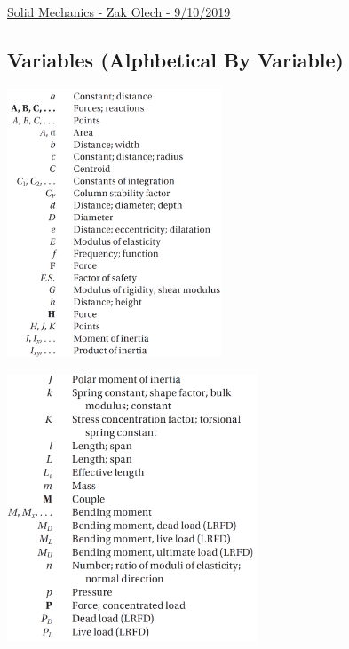 \documentclass[10pt,landscape]{article}
\newenvironment{Figure}
     {\par\medskip\noindent\minipage{\linewidth}}
     {\endminipage\par\medskip}
\begin{document}
\raggedright
\footnotesize

\begin{center}
     \Large{\underline{Solid Mechanics - Zak Olech - 9/10/2019}}
\end{center}
\begin{multicols}{3}

\setlength{\columnseprule}{0.25pt}
\setlength{\premulticols}{1pt}
\setlength{\postmulticols}{1pt}
\setlength{\multicolsep}{1pt}
\setlength{\columnsep}{2pt}

\section{Variables (Alphbetical By Variable)}
\begin{Figure}
    \centering
    \includegraphics[width=\linewidth, height=8cm]{ListOfSymbols_Part_1.png}
\end{Figure}
\begin{Figure}
    \centering
    \includegraphics[width=\linewidth, height=8cm]{ListOfSymbols_Part_2.png}

\end{Figure}
\end{multicols}
\end{document}
